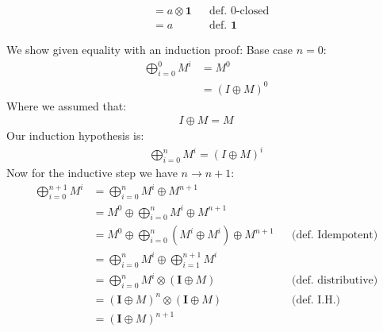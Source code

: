 \documentclass[a4paper,12pt]{ETHexercise}
\begin{document}
\begin{question}
\begin{subquestion}
\begin{align}
			           & = a \otimes \mathbf{1}                                  &  & \text{def. 0-closed}     \\
			           & = a                                                     &  & \text{def. $\mathbf{1}$}
		\end{align}
	\end{subquestion}
	\begin{subquestion}
		We show given equality with an induction proof:
		Base case $n = 0$:
		\begin{align}
			\bigoplus_{i=0}^{0} M^i & = M^0                         \\
			                        & = \left( I \oplus M \right)^0
		\end{align}
		Where we assumed that:
		\begin{align}
			I \oplus M = M
		\end{align}
		Our induction hypothesis is:
		\begin{align}
			\bigoplus_{i=0}^{n} M^i = \left( I \oplus M \right)^{i}
		\end{align}
		Now for the inductive step we have $n \rightarrow n+1$:
		\begin{align}
			\bigoplus_{i=0}^{n+1} M^i & = \bigoplus_{i=0}^{n} M^i \oplus M^{n+1}                                                                         \\
			                          & = M^0 \oplus \bigoplus_{i=0}^{n} M^i \oplus M^{n+1}                                                              \\
			                          & = M^0 \oplus\bigoplus_{i=0}^{n} \left(  M^i \oplus M^i \right) \oplus M^{n+1}    &  & \text{(def. Idempotent)}   \\
			                          & = \bigoplus_{i=0}^{n} M^i \oplus \bigoplus_{i=1}^{n+1} M^i                                                       \\
			                          & = \bigoplus_{i=0}^{n} M^{i} \otimes \left( \mathbf{I} \oplus M\right)            &  & \text{(def. distributive)} \\
			                          & = \left( \mathbf{I} \oplus M \right)^n \otimes \left( \mathbf{I} \oplus M\right) &  & \text{(def. I.H.)}         \\
			                          & = \left( \mathbf{I} \oplus M \right)^{n+1}
		\end{align}
	\end{subquestion}
	\begin{subquestion}

\end{subquestion}
\end{question}
\end{document}
